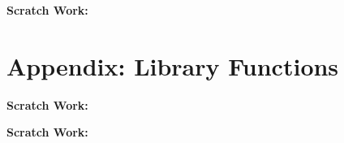 \documentclass[11pt,addpoints]{exam}
\begin{document}
\newpage
\large{\textbf{Scratch Work:}}

\vspace*{\fill}


\newpage
\section*{Appendix: Library Functions}


 \newpage
 \large{\textbf{Scratch Work:}}


\newpage
\large{\textbf{Scratch Work:}}

\vspace*{\fill}
\end{document}

